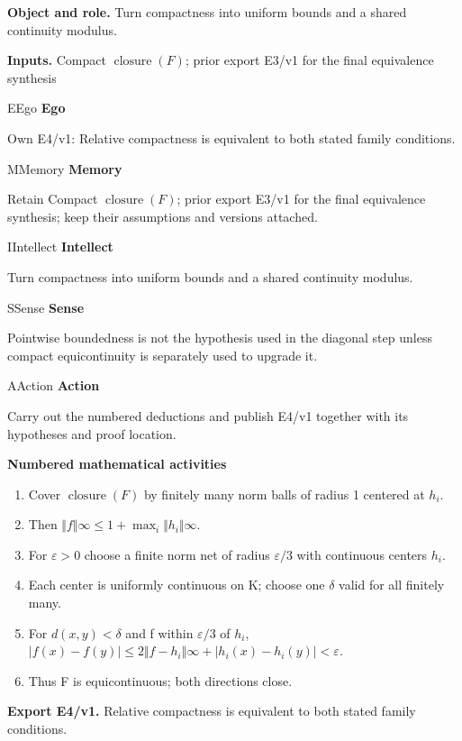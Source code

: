 \documentclass[preprint,12pt,aps,pra,showkeys,amsmath,amssymb,superscriptaddress,floatfix]{revtex4-2}
\theoremstyle{definition}
\theoremstyle{remark}
\newcommand{\mmfaculty}[3]{%
 \begin{mmfacultybox}{#1}{#2}
 {\sffamily\bfseries\color{MMBlue}#2}\par\smallskip #3
 \end{mmfacultybox}}
\newcommand{\field}[2]{\par\smallskip\noindent\textbf{#1.} #2\par}
\begin{document}
\field{Object and role}{Turn compactness into uniform bounds and a shared continuity modulus.}

\field{Inputs}{Compact \(\operatorname{closure} (F)\); prior export E3/v1 for the final
equivalence synthesis}

\mmfaculty{E}{Ego}{Own E4/v1: Relative compactness is equivalent to both stated family
conditions.}

\mmfaculty{M}{Memory}{Retain Compact \(\operatorname{closure} (F)\); prior export E3/v1 for
the final equivalence synthesis; keep their assumptions and versions
attached.}

\mmfaculty{I}{Intellect}{Turn compactness into uniform bounds and a shared continuity modulus.}

\mmfaculty{S}{Sense}{Pointwise boundedness is not the hypothesis used in the diagonal step
unless compact equicontinuity is separately used to upgrade it.}

\mmfaculty{A}{Action}{Carry out the numbered deductions and publish E4/v1 together with its
hypotheses and proof location.}

\smallskip\noindent\textbf{Numbered mathematical activities}

\begin{enumerate}[label=N4.\arabic*,leftmargin=3.4em]

\item Cover \(\operatorname{closure} (F)\) by finitely many norm balls of
radius 1 centered at \(h_i\).

\item Then
\(\Vert f\Vert \infty \le 1+\operatorname{max} _i\Vert h_i\Vert \infty\).

\item For \(\varepsilon >0\) choose a finite norm net of radius
\(\varepsilon /3\) with continuous centers \(h_i\).

\item Each center is uniformly continuous on K; choose one \(\delta\) valid
for all finitely many.

\item For \(d(x,y)<\delta\) and f within \(\varepsilon /3\) of \(h_i\),
\(|f(x)-f(y)|\le 2\Vert f-h_i\Vert \infty +|h_i(x)-h_i(y)|<\varepsilon\).

\item Thus F is equicontinuous; both directions close.

\end{enumerate}

\field{Export E4/v1}{Relative compactness is equivalent to both stated family conditions.}
\end{document}
